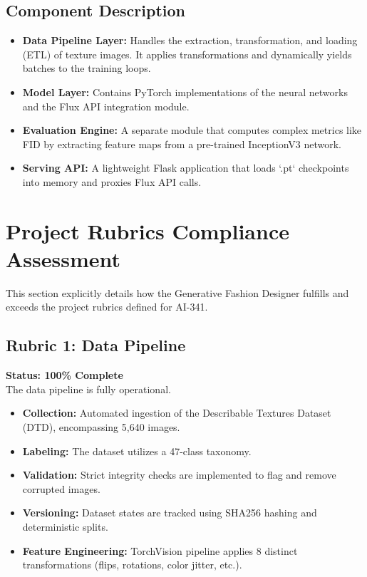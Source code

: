 \documentclass[12pt,a4paper]{article}
\begin{document}
\subsection{Component Description}
\begin{itemize}
    \item \textbf{Data Pipeline Layer:} Handles the extraction, transformation, and loading (ETL) of texture images. It applies transformations and dynamically yields batches to the training loops.
    \item \textbf{Model Layer:} Contains PyTorch implementations of the neural networks and the Flux API integration module.
    \item \textbf{Evaluation Engine:} A separate module that computes complex metrics like FID by extracting feature maps from a pre-trained InceptionV3 network.
    \item \textbf{Serving API:} A lightweight Flask application that loads `.pt` checkpoints into memory and proxies Flux API calls.
\end{itemize}

\section{Project Rubrics Compliance Assessment}

This section explicitly details how the Generative Fashion Designer fulfills and exceeds the project rubrics defined for AI-341.

\subsection{Rubric 1: Data Pipeline}
\textbf{Status: 100\% Complete} \\
The data pipeline is fully operational.
\begin{itemize}
    \item \textbf{Collection:} Automated ingestion of the Describable Textures Dataset (DTD), encompassing 5,640 images.
    \item \textbf{Labeling:} The dataset utilizes a 47-class taxonomy.
    \item \textbf{Validation:} Strict integrity checks are implemented to flag and remove corrupted images.
    \item \textbf{Versioning:} Dataset states are tracked using SHA256 hashing and deterministic splits.
    \item \textbf{Feature Engineering:} TorchVision pipeline applies 8 distinct transformations (flips, rotations, color jitter, etc.).
\end{itemize}
\end{document}
